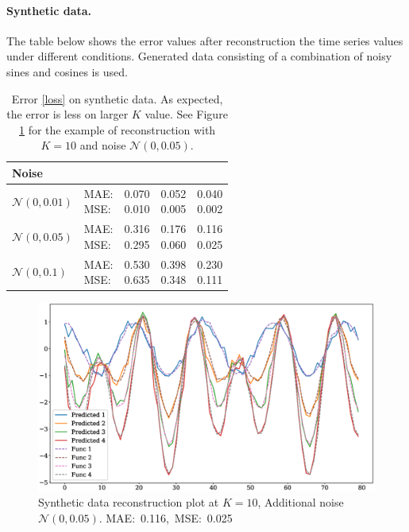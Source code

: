 \documentclass[12pt]{article}
\begin{document}
{\paragraph{Synthetic data.} The table below shows the error values after reconstruction the time series values under different conditions. Generated data consisting of a combination of noisy sines and cosines is used.

\begin{table}[!h]
\def\arraystretch{2.3}
\begin{center}
\caption{Error \eqref{loss} on synthetic data. As expected, the error is less on larger $K$ value. See Figure \ref{fig:fig5} for the example of reconstruction with $K=10$ and noise $\mathcal{N}(0, 0.05)$.}
\begin{tabular}{|l||l||*{3}{c|}}\hline
	{Noise}
	&\makebox[3em]{Metric}&\makebox[3em]{$K=2$}&\makebox[3em]{$K=4$}&\makebox[3em]{$K=10$}\\\hline
	$\mathcal{N}(0, 0.01)$&\makecell{ MAE: \\ MSE: } &\makecell{ 0.070 \\ 0.010 }&\makecell{ 0.052 \\ 0.005 }&\makecell{ 0.040 \\ 0.002 }\\\hline
	$\mathcal{N}(0, 0.05)$&\makecell{ MAE: \\ MSE: } &\makecell{ 0.316 \\ 0.295 }&\makecell{ 0.176 \\ 0.060 }&\makecell{ 0.116 \\ 0.025 }\\\hline
	$\mathcal{N}(0, 0.1)$& \makecell{ MAE: \\ MSE: } &\makecell{ 0.530 \\ 0.635 }&\makecell{ 0.398 \\ 0.348 }&\makecell{ 0.230 \\ 0.111 }\\\hline
\end{tabular}
\end{center}
\end{table}


\begin{figure}[!htbp]
	\centering
	\includegraphics[width=\textwidth]{synthetic_time_series_K10N005.eps}
	\caption{Synthetic data reconstruction plot at $K=10$, Additional noise $\mathcal{N}(0, 0.05)$. \mbox{MAE: 0.116, MSE: 0.025}}
	\label{fig:fig5}
\end{figure}

}
\end{document}
